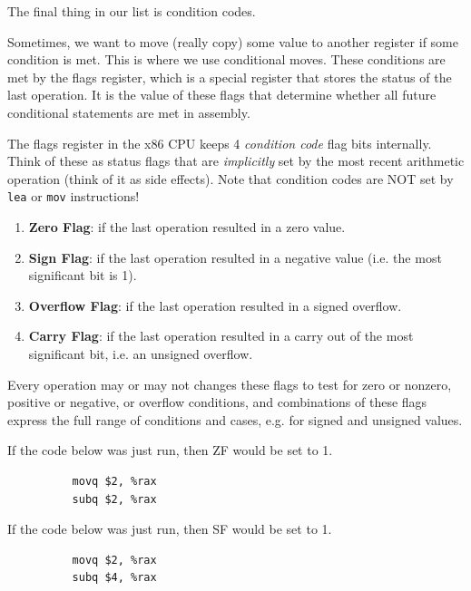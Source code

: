 \documentclass{article}
\begin{document}
      The final thing in our list is condition codes. 

      Sometimes, we want to move (really copy) some value to another register if some condition is met. This is where we use conditional moves. These conditions are met by the flags register, which is a special register that stores the status of the last operation. It is the value of these flags that determine whether all future conditional statements are met in assembly. 
      
      \begin{definition}
        The flags register in the x86 CPU keeps 4 \textit{condition code} flag bits internally. Think of these as status flags that are \textit{implicitly} set by the most recent arithmetic operation (think of it as side effects). Note that condition codes are NOT set by \texttt{lea} or \texttt{mov} instructions! 
        \begin{enumerate}
          \item \textbf{Zero Flag}: if the last operation resulted in a zero value.
          \item \textbf{Sign Flag}: if the last operation resulted in a negative value (i.e. the most significant bit is 1).
          \item \textbf{Overflow Flag}: if the last operation resulted in a signed overflow.
          \item \textbf{Carry Flag}: if the last operation resulted in a carry out of the most significant bit, i.e. an unsigned overflow. 
        \end{enumerate}
        Every operation may or may not changes these flags to test for zero or nonzero, positive or negative, or overflow conditions, and combinations of these flags express the full range of conditions and cases, e.g. for signed and unsigned values. 
      \end{definition}

      \begin{example}
        If the code below was just run, then ZF would be set to 1. 
        \begin{lstlisting}
          movq $2, %rax 
          subq $2, %rax
        \end{lstlisting}
      \end{example}

      \begin{example}
        If the code below was just run, then SF would be set to 1. 
        \begin{lstlisting}
          movq $2, %rax 
          subq $4, %rax
        \end{lstlisting}
      \end{example}
\end{document}
